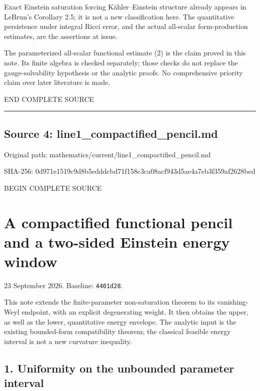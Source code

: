 \documentclass[
  10pt,
]{article}
\begin{document}
Exact Einstein saturation forcing Kähler--Einstein structure already
appears in LeBrun's Corollary 2.5; it is not a new classification here.
The quantitative persistence under integral Ricci error, and the actual
all-scalar form-production estimates, are the assertions at issue.

The parameterized all-scalar functional estimate (2) is the claim proved
in this note. Its finite algebra is checked separately; those checks do
not replace the gauge-solvability hypothesis or the analytic proofs. No
comprehensive priority claim over later literature is made.

END COMPLETE SOURCE

\begin{center}\rule{0.5\linewidth}{0.5pt}\end{center}

\hypertarget{source-4-line1_compactified_pencil.md}{%
\subsection{Source 4:
line1\_compactified\_pencil.md}\label{source-4-line1_compactified_pencil.md}}

Original path: mathematics/current/line1\_compactified\_pencil.md

SHA-256:
0d971e1519c9d8b5edddcbd71f158c3ca08acf943d5ae4a7eb3f359af2628bed

BEGIN COMPLETE SOURCE

\hypertarget{a-compactified-functional-pencil-and-a-two-sided-einstein-energy-window}{%
\section{A compactified functional pencil and a two-sided Einstein
energy
window}\label{a-compactified-functional-pencil-and-a-two-sided-einstein-energy-window}}

23 September 2026. Baseline: \texttt{4401d28}.

This note extends the finite-parameter non-saturation theorem to its
vanishing-Weyl endpoint, with an explicit degenerating weight. It then
obtains the upper, as well as the lower, quantitative energy envelope.
The analytic input is the existing bounded-form compatibility theorem;
the classical feasible energy interval is not a new curvature
inequality.

\hypertarget{uniformity-on-the-unbounded-parameter-interval}{%
\subsection{1. Uniformity on the unbounded parameter
interval}\label{uniformity-on-the-unbounded-parameter-interval}}
\end{document}
